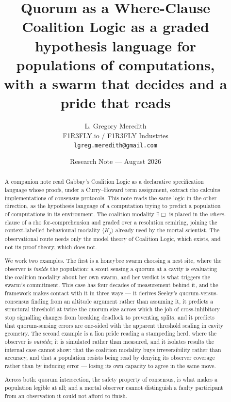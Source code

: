 \documentclass[11pt,a4paper]{article}
\title{\bfseries Quorum as a Where-Clause\\[4pt]
\large Coalition Logic as a graded hypothesis language for populations of
computations,\\
with a swarm that decides and a pride that reads}
\author{L. Gregory Meredith\\
\small F1R3FLY.io / F1R3FLY Industries\\
\small \texttt{lgreg.meredith@gmail.com}}
\date{Research Note --- August 2026}
\theoremstyle{plain}
\theoremstyle{definition}
\theoremstyle{remark}
\newcommand{\Ebox}{\exists\Box}
\newcommand{\gK}[1]{\langle K_{#1}\rangle}
\begin{document}
\maketitle

\begin{abstract}
A companion note read Gabbay's Coalition Logic as a declarative specification
language whose proofs, under a Curry--Howard term assignment, extract rho
calculus implementations of consensus protocols. This note reads the same logic
in the other direction, as the hypothesis language of a computation trying to
predict a population of computations in its environment. The coalition modality
$\Ebox$ is placed in the \emph{where}-clause of a rho for-comprehension and
graded over a resolution semiring, joining the context-labelled behavioural
modality $\gK{j}$ already used by the mortal scientist. The observational route
needs only the model theory of Coalition Logic, which exists, and not its proof
theory, which does not.

We work two examples. The first is a honeybee swarm choosing a nest site, where
the observer is \emph{inside} the population: a scout sensing a quorum at a
cavity is evaluating the coalition modality about her own swarm, and her verdict
is what triggers the swarm's commitment. This case has four decades of
measurement behind it, and the framework makes contact with it in three ways
--- it derives Seeley's quorum-versus-consensus finding from an altitude
argument rather than assuming it, it predicts a structural threshold at twice
the quorum size across which the job of cross-inhibitory stop signalling
changes from breaking deadlock to preventing splits, and it predicts that
quorum-sensing errors are one-sided with the apparent threshold scaling in
cavity geometry. The second example is a lion pride reading a stampeding herd,
where the observer is \emph{outside}; it is simulated rather than measured, and
it isolates results the internal case cannot show: that the coalition modality
buys irreversibility rather than accuracy, and that a population resists being
read by denying its observer coverage rather than by inducing error --- losing
its own capacity to agree in the same move.

Across both: quorum intersection, the safety property of consensus, is what
makes a population legible at all; and a mortal observer cannot distinguish a
faulty participant from an observation it could not afford to finish.
\end{abstract}

\tableofcontents
\end{document}
